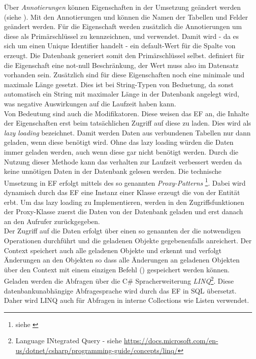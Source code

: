Über \emph{Annotierungen} können Eigenschaften in der Umsetzung geändert werden (siehe \parencite{eftut}). Mit den Annotierungen  und  können die Namen der Tabellen und Felder geändert werden. Für die Eigenschaft   werden zusätzlich die Annotierungen  um diese als Primärschlüssel zu kennzeichnen, und  verwendet. Damit wird - da es sich um einen Unique Identifier handelt - ein default-Wert für die Spalte von  erzeugt. Die Datenbank generiert somit den Primärschlüssel selbst.  definiert für die Eigenschaft  eine not-null Beschränkung, der Wert muss also im Datensatz vorhanden sein. Zusätzlich sind für diese Eigenschaften noch eine minimale und maximale Länge gesetzt. Dies ist bei String-Typen von Beduetung, da sonst automatisch ein String mit maximaler Länge in der Datenbank angelegt wird, was negative Auswirkungen auf die Laufzeit haben kann. 
\\Von Bedeutung sind auch die  Modifikatoren. Diese weisen das EF an, die Inhalte der Eigenschaften erst beim tatsächlichen Zugriff auf diese zu laden. Dies wird als \emph{lazy loading} bezeichnet. Damit werden Daten aus verbundenen Tabellen nur dann geladen, wenn diese benötigt wird. Ohne das lazy loading würden die Daten immer geladen werden, auch wenn diese gar nicht benötigt werden. Durch die Nutzung dieser Methode kann das verhalten zur Laufzeit verbessert werden da keine unnötigen Daten in der Datenbank gelesen werden. Die technische Umsetzung in EF erfolgt mittels des so genannten \emph{Proxy-Patterns} \footnote{ siehe \parencite[S. 207ff]{gamma1995}}\parencite{ms_proxy}. Dabei wird dynamisch durch das EF eine Instanz einer Klasse erzeugt die von der Entität erbt. Um das lazy loading zu Implementieren, werden in den Zugriffsfunktionen der Proxy-Klasse zuerst die Daten von der Datenbank geladen und erst danach an den Aufrufer zurückgegeben.
\\Der Zugriff auf die Daten erfolgt über einen so genannten  der die notwendigen Operationen durchführt und die geladenen Objekte gegebenenfalls anreichert. Der Context speichert auch alle geladenen Objekte und erkennt und verfolgt Änderungen an den Objekten so dass alle Änderungen an geladenen Objekten über den Context mit einem einzigen Befehl () gespeichert werden können.
\\Geladen werden die Abfragen über die C\# Spracherweiterung \emph{LINQ}\footnote{Language INtegrated Query - siehe \url{https://docs.microsoft.com/en-us/dotnet/csharp/programming-guide/concepts/linq/}}. Diese datenbankunabhängige Abfragesprache wird durch das EF in SQL übersetzt. Daher wird LINQ auch für Abfragen in interne Collections wie Listen verwendet.
